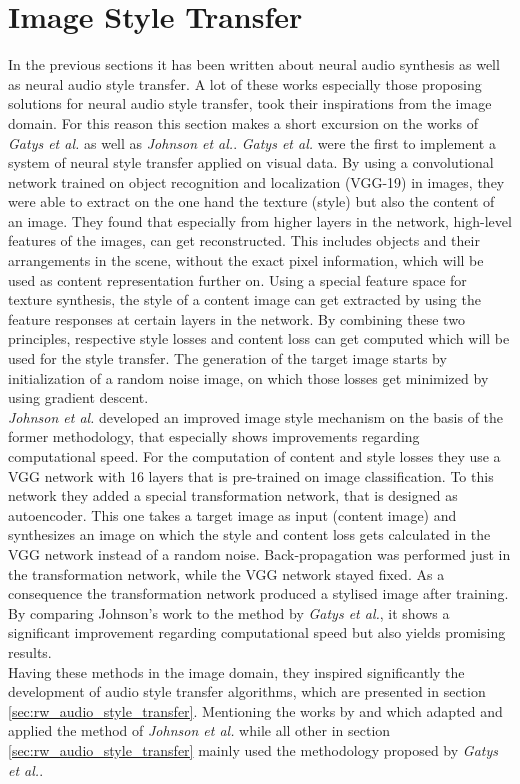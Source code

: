 \section{Image Style Transfer}
\label{sec:rw_imgstyletransfer}
In the previous sections it has been written about neural audio synthesis as well as neural audio style transfer. A lot of these works especially those proposing solutions for neural audio style transfer, took their inspirations from the image domain. For this reason this section makes a short excursion on the works of \textit{Gatys et al.} as well as \textit{Johnson et al.}. \cite{Gatys2016, johnson2016perceptual} \textit{Gatys et al.} were the first to implement a system of neural style transfer applied on visual data. By using a convolutional network trained on object recognition and localization (VGG-19) in images, they were able to extract on the one hand the texture (style) but also the content of an image. They found that especially from higher layers in the network, high-level features of the images, can get reconstructed. This includes objects and their arrangements in the scene, without the exact pixel information, which will be used as content representation further on. Using a special feature space for texture synthesis, the style of a content image can get extracted by using the feature responses at certain layers in the network. By combining these two principles, respective style losses and content loss can get computed which will be used for the style transfer. The generation of the target image starts by initialization of a random noise image, on which those losses get minimized by using gradient descent.\\
\textit{Johnson et al.} developed an improved image style mechanism on the basis of the former methodology, that especially shows improvements regarding computational speed. For the computation of content and style losses they use a VGG network with 16 layers that is pre-trained on image classification. To this network they added a special transformation network, that is designed as autoencoder. This one takes a target image as input (content image) and synthesizes an image on which the style and content loss gets calculated in the VGG network instead of a random noise. Back-propagation was performed just in the transformation network, while the VGG network stayed fixed. As a consequence the transformation network produced a stylised image after training. By comparing Johnson's work to the method by \textit{Gatys et al.}, it shows a significant improvement regarding computational speed but also yields promising results.\\
Having these methods in the image domain, they inspired significantly the development of audio style transfer algorithms, which are presented in section \ref{sec:rw_audio_style_transfer}. Mentioning the works by \cite{Ramani2018} and \cite{Liu2019} which adapted and applied the method of \textit{Johnson et al.} while all other in section \ref{sec:rw_audio_style_transfer} mainly used the methodology proposed by \textit{Gatys et al.}.